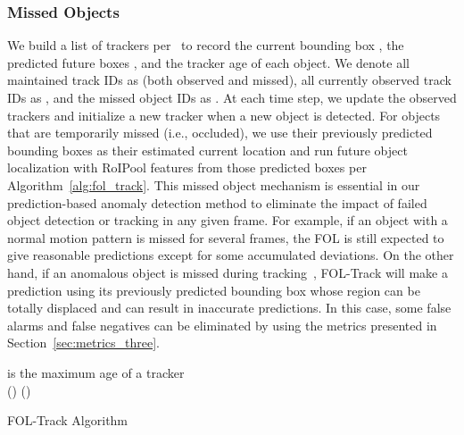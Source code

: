 \documentclass[letterpaper, 10 pt, conference]{ieeeconf}
\theoremstyle{definition}
\theoremstyle{remark}
\begin{document}
\subsubsection{Missed Objects}
We build a list of trackers  per~\cite{wojke2017simple} to 
record the current bounding box
, the predicted future boxes , 
and the tracker
age  of each object. 
We denote all maintained track IDs as  (both observed 
and missed), all currently observed track IDs as , and the 
missed object IDs as .
At each time step, we
update the observed trackers and initialize a new tracker when a new object
is detected.  For objects that are temporarily missed (i.e., occluded), 
we use their previously predicted bounding boxes as
their estimated current location and run future object localization 
with RoIPool features
from those predicted boxes per Algorithm~\ref{alg:fol_track}. 
This missed object mechanism is essential in our prediction-based
anomaly detection method to eliminate the impact of failed object
detection or tracking in any given frame. For example, if an object with a normal motion
pattern is missed for several frames, the FOL is still expected to
give reasonable predictions except for some accumulated deviations. On the
other hand, if an anomalous object is missed during tracking~\cite{wojke2017simple}, 
FOL-Track will make a prediction using its previously
predicted bounding box whose region can be totally displaced and can
result in inaccurate predictions. In this case, some false alarms and false
negatives can be eliminated by using the metrics presented in
Section~\ref{sec:metrics_three}.

\vspace{-4pt}
\begin{algorithm}
     is the maximum age of a tracker \\
	\For(){}{
	    \Else{
             \\
            
        }
	}
	\For(){}{
		\Else{
             \\
             
		}
	}		   
	\caption{FOL-Track Algorithm}
	\label{alg:fol_track}
\end{algorithm}
\vspace{-8pt}
\end{document}

